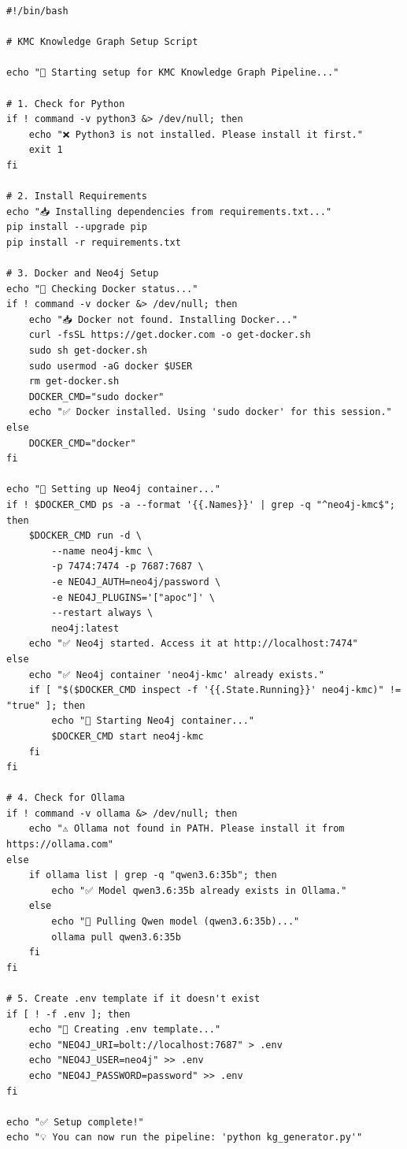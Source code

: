 \documentclass[11pt]{article}
\begin{document}
\begin{lstlisting}[style=bashcode, caption={setup.sh}]
#!/bin/bash

# KMC Knowledge Graph Setup Script

echo "🚀 Starting setup for KMC Knowledge Graph Pipeline..."

# 1. Check for Python
if ! command -v python3 &> /dev/null; then
    echo "❌ Python3 is not installed. Please install it first."
    exit 1
fi

# 2. Install Requirements
echo "📥 Installing dependencies from requirements.txt..."
pip install --upgrade pip
pip install -r requirements.txt

# 3. Docker and Neo4j Setup
echo "🐳 Checking Docker status..."
if ! command -v docker &> /dev/null; then
    echo "📥 Docker not found. Installing Docker..."
    curl -fsSL https://get.docker.com -o get-docker.sh
    sudo sh get-docker.sh
    sudo usermod -aG docker $USER
    rm get-docker.sh
    DOCKER_CMD="sudo docker"
    echo "✅ Docker installed. Using 'sudo docker' for this session."
else
    DOCKER_CMD="docker"
fi

echo "🚢 Setting up Neo4j container..."
if ! $DOCKER_CMD ps -a --format '{{.Names}}' | grep -q "^neo4j-kmc$"; then
    $DOCKER_CMD run -d \
        --name neo4j-kmc \
        -p 7474:7474 -p 7687:7687 \
        -e NEO4J_AUTH=neo4j/password \
        -e NEO4J_PLUGINS='["apoc"]' \
        --restart always \
        neo4j:latest
    echo "✅ Neo4j started. Access it at http://localhost:7474"
else
    echo "✅ Neo4j container 'neo4j-kmc' already exists."
    if [ "$($DOCKER_CMD inspect -f '{{.State.Running}}' neo4j-kmc)" != "true" ]; then
        echo "🔄 Starting Neo4j container..."
        $DOCKER_CMD start neo4j-kmc
    fi
fi

# 4. Check for Ollama
if ! command -v ollama &> /dev/null; then
    echo "⚠️ Ollama not found in PATH. Please install it from https://ollama.com"
else
    if ollama list | grep -q "qwen3.6:35b"; then
        echo "✅ Model qwen3.6:35b already exists in Ollama."
    else
        echo "🧠 Pulling Qwen model (qwen3.6:35b)..."
        ollama pull qwen3.6:35b
    fi
fi

# 5. Create .env template if it doesn't exist
if [ ! -f .env ]; then
    echo "📝 Creating .env template..."
    echo "NEO4J_URI=bolt://localhost:7687" > .env
    echo "NEO4J_USER=neo4j" >> .env
    echo "NEO4J_PASSWORD=password" >> .env
fi

echo "✅ Setup complete!"
echo "💡 You can now run the pipeline: 'python kg_generator.py'"
\end{lstlisting}
\end{document}
